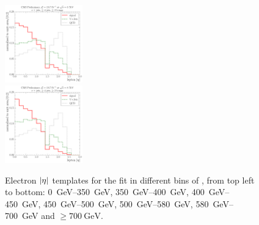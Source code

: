 \begin{figure}[!htbp]
    {\includegraphics[width=0.3\textwidth]{measurement/ST/central/fit_templates/electron_templates_bin_580-700}}\\
    {\includegraphics[width=0.3\textwidth]{measurement/ST/central/fit_templates/electron_templates_bin_700-inf}}
    \caption[Electron $\abs \eta$ templates for the fit in different bins of \ST]{Electron $\abs \eta$ templates for the
    fit in different bins of \ST, from top left to bottom: \SIrange{0}{350}{\GeV}, \SIrange{350}{400}{\GeV},
    \SIrange{400}{450}{\GeV}, \SIrange{450}{500}{\GeV}, \SIrange{500}{580}{\GeV}, \SIrange{580}{700}{\GeV} and $\geq
    \SI{700}{\GeV}$.}
    \label{fig:fit_tempaltes_ST_electron}
\end{figure}

